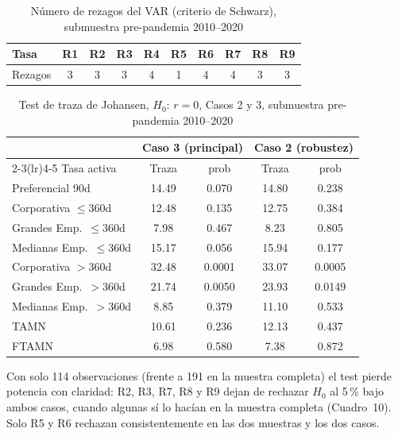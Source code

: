 \documentclass[12pt, letterpaper]{article}
\begin{document}
\begin{table}[ht]
\renewcommand{\thetable}{12}
\caption{Número de rezagos del VAR (criterio de Schwarz), submuestra
         pre-pandemia 2010--2020}
\label{tab:rezagospre}
\centering
\small
\begin{tabular}{lccccccccc}
\toprule
Tasa & R1 & R2 & R3 & R4 & R5 & R6 & R7 & R8 & R9 \\
\midrule
Rezagos & 3 & 3 & 3 & 4 & 1 & 4 & 4 & 3 & 3 \\
\bottomrule
\end{tabular}
\end{table}

\begin{table}[ht]
\renewcommand{\thetable}{13}
\begin{threeparttable}
\caption{Test de traza de Johansen, $H_0{:}\,r=0$, Casos 2 y 3,
         submuestra pre-pandemia 2010--2020}
\label{tab:trazapre}
\small
\begin{tabular}{lcccc}
\toprule
& \multicolumn{2}{c}{Caso 3 (principal)} & \multicolumn{2}{c}{Caso 2 (robustez)} \\
\cmidrule(lr){2-3}\cmidrule(lr){4-5}
Tasa activa & Traza & prob & Traza & prob \\
\midrule
Preferencial 90d         & 14.49 & 0.070 & 14.80 & 0.238 \\
Corporativa $\le$360d    & 12.48 & 0.135 & 12.75 & 0.384 \\
Grandes Emp.\ $\le$360d  & 7.98  & 0.467 & 8.23  & 0.805 \\
Medianas Emp.\ $\le$360d & 15.17 & 0.056 & 15.94 & 0.177 \\
Corporativa $>$360d      & 32.48 & 0.0001 & 33.07 & 0.0005 \\
Grandes Emp.\ $>$360d    & 21.74 & 0.0050 & 23.93 & 0.0149 \\
Medianas Emp.\ $>$360d   & 8.85  & 0.379 & 11.10 & 0.533 \\
TAMN                     & 10.61 & 0.236 & 12.13 & 0.437 \\
FTAMN                    & 6.98  & 0.580 & 7.38  & 0.872 \\
\bottomrule
\end{tabular}
\begin{tablenotes}[flushleft]
\footnotesize\item
Con solo 114 observaciones (frente a 191 en la muestra completa) el
test pierde potencia con claridad: R2, R3, R7, R8 y R9 dejan de
rechazar $H_0$ al 5\,\% bajo ambos casos, cuando algunas sí lo hacían
en la muestra completa (Cuadro~10). Solo R5 y R6 rechazan
consistentemente en las dos muestras y los dos casos.
\end{tablenotes}
\end{threeparttable}
\end{table}
\end{document}
